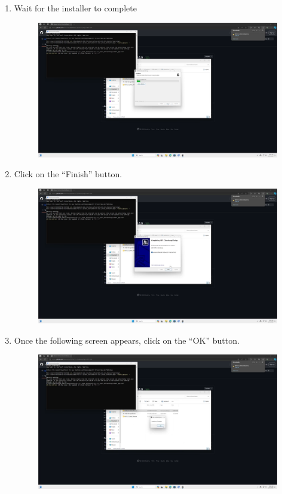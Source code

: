 \documentclass[12pt]{article}
\begin{document}
\begin{center}
\begin{enumerate}
\begin{figure}[H]
		      \end{figure}
		\item Wait for the installer to complete
		      \begin{figure}[H]
			      \includegraphics[width=\textwidth]{Figures/Windows-Ghostscript-Menu-3.png}
		      \end{figure}
		\item Click on the ``Finish'' button.
		      \begin{figure}[H]
			      \includegraphics[width=\textwidth]{Figures/Windows-Ghostscript-Menu-4.png}
		      \end{figure}
		\item Once the following screen appears, click on the ``OK'' button.
		      \begin{figure}[H]
			      \includegraphics[width=\textwidth]{Figures/Windows-Ghostscript-Menu-5.png}

\end{figure}
\end{enumerate}
\end{center}
\end{document}

